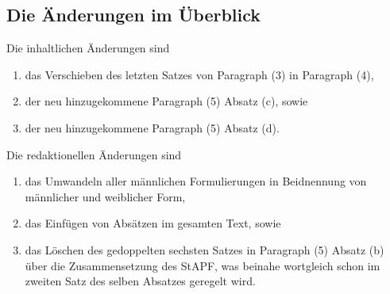 \documentclass[draft,12pt,oneside]{scrartcl}
\begin{document}
\subsection*{Die Änderungen im Überblick}

Die inhaltlichen Änderungen sind
\begin{enumerate}
\item das Verschieben des letzten Satzes von Paragraph (3) in Paragraph (4),
\item der neu hinzugekommene Paragraph (5) Absatz (c), sowie
\item der neu hinzugekommene Paragraph (5) Absatz (d).
\end{enumerate}

Die redaktionellen Änderungen sind
\begin{enumerate}
\item das Umwandeln aller männlichen Formulierungen in Beidnennung von männlicher und weiblicher Form,
\item das Einfügen von Absätzen im gesamten Text, sowie
\item das Löschen des gedoppelten sechsten Satzes in Paragraph (5) Absatz (b) über die Zusammensetzung des StAPF,
      was beinahe wortgleich schon im zweiten Satz des selben Absatzes geregelt wird.
\end{enumerate}
\end{document}
